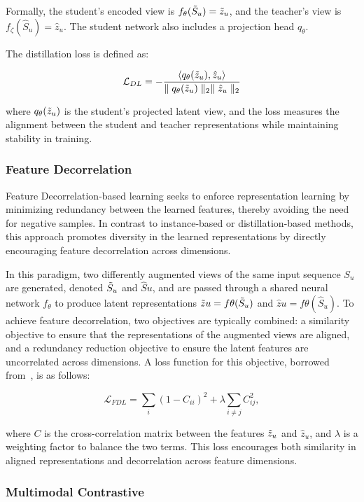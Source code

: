 Formally, the student’s encoded view is $f_\theta(\Tilde{S}_u) = \Tilde{z}_u$, and the teacher’s view is $f_\zeta(\hat{S}_u) = \hat{z}_u$. The student network also includes a projection head $q_\theta$.

The distillation loss is defined as:

$$ 
\mathcal{L}_{DL} = - \frac{\langle q_\theta(\Tilde{z}_u), \hat{z}_u \rangle}{\parallel q_\theta(\Tilde{z}_u) \parallel_2 \parallel \hat{z}_u \parallel_2}
$$

where $q_\theta(\Tilde{z}_u)$ is the student's projected latent view, and the loss measures the alignment between the student and teacher representations while maintaining stability in training.

\subsubsection{Feature Decorrelation}
\label{appendix:feature-decor}

Feature Decorrelation-based learning seeks to enforce representation learning by minimizing redundancy between the learned features, thereby avoiding the need for negative samples. 
In contrast to instance-based or distillation-based methods, this approach promotes diversity in the learned representations by directly encouraging feature decorrelation across dimensions.

In this paradigm, two differently augmented views of the same input sequence $S_u$ are generated, denoted $\Tilde{S}_u$ and $\hat{S}u$, and are passed through a shared neural network $f_\theta$ to produce latent representations $\Tilde{z}u = f\theta(\Tilde{S}_u)$ and $\hat{z}u = f\theta(\hat{S}_u)$.
To achieve feature decorrelation, two objectives are typically combined: a similarity objective to ensure that the representations of the augmented views are aligned, and a redundancy reduction objective to ensure the latent features are uncorrelated across dimensions.
A loss function for this objective, borrowed from~\cite{zbontar2021barlow}, is as follows:

$$\mathcal{L}_{FDL} = \sum\limits_i(1-C_{ii})^2 + \lambda \sum\limits_{i \neq j} C^2_{ij},$$

where $C$ is the cross-correlation matrix between the features $\Tilde{z}_u$ and $\hat{z}_u$, and $\lambda$ is a weighting factor to balance the two terms. This loss encourages both similarity in aligned representations and decorrelation across feature dimensions.

\subsubsection{Multimodal Contrastive}
\label{appendix:multimodal-learning}

